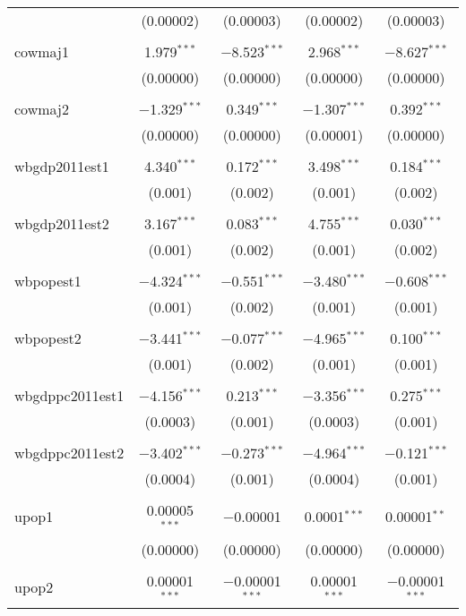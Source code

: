 \begin{table}[!htbp]
\begin{tabular}{@{\extracolsep{5pt}}lcccc}
  & (0.00002) & (0.00003) & (0.00002) & (0.00003) \\ 
  & & & & \\ 
 cowmaj1 & 1.979$^{***}$ & $-$8.523$^{***}$ & 2.968$^{***}$ & $-$8.627$^{***}$ \\ 
  & (0.00000) & (0.00000) & (0.00000) & (0.00000) \\ 
  & & & & \\ 
 cowmaj2 & $-$1.329$^{***}$ & 0.349$^{***}$ & $-$1.307$^{***}$ & 0.392$^{***}$ \\ 
  & (0.00000) & (0.00000) & (0.00001) & (0.00000) \\ 
  & & & & \\ 
 wbgdp2011est1 & 4.340$^{***}$ & 0.172$^{***}$ & 3.498$^{***}$ & 0.184$^{***}$ \\ 
  & (0.001) & (0.002) & (0.001) & (0.002) \\ 
  & & & & \\ 
 wbgdp2011est2 & 3.167$^{***}$ & 0.083$^{***}$ & 4.755$^{***}$ & 0.030$^{***}$ \\ 
  & (0.001) & (0.002) & (0.001) & (0.002) \\ 
  & & & & \\ 
 wbpopest1 & $-$4.324$^{***}$ & $-$0.551$^{***}$ & $-$3.480$^{***}$ & $-$0.608$^{***}$ \\ 
  & (0.001) & (0.002) & (0.001) & (0.001) \\ 
  & & & & \\ 
 wbpopest2 & $-$3.441$^{***}$ & $-$0.077$^{***}$ & $-$4.965$^{***}$ & 0.100$^{***}$ \\ 
  & (0.001) & (0.002) & (0.001) & (0.001) \\ 
  & & & & \\ 
 wbgdppc2011est1 & $-$4.156$^{***}$ & 0.213$^{***}$ & $-$3.356$^{***}$ & 0.275$^{***}$ \\ 
  & (0.0003) & (0.001) & (0.0003) & (0.001) \\ 
  & & & & \\ 
 wbgdppc2011est2 & $-$3.402$^{***}$ & $-$0.273$^{***}$ & $-$4.964$^{***}$ & $-$0.121$^{***}$ \\ 
  & (0.0004) & (0.001) & (0.0004) & (0.001) \\ 
  & & & & \\ 
 upop1 & 0.00005$^{***}$ & $-$0.00001 & 0.0001$^{***}$ & 0.00001$^{**}$ \\ 
  & (0.00000) & (0.00000) & (0.00000) & (0.00000) \\ 
  & & & & \\ 
 upop2 & 0.00001$^{***}$ & $-$0.00001$^{***}$ & 0.00001$^{***}$ & $-$0.00001$^{***}$ \\ 

\end{tabular}
\end{table}
